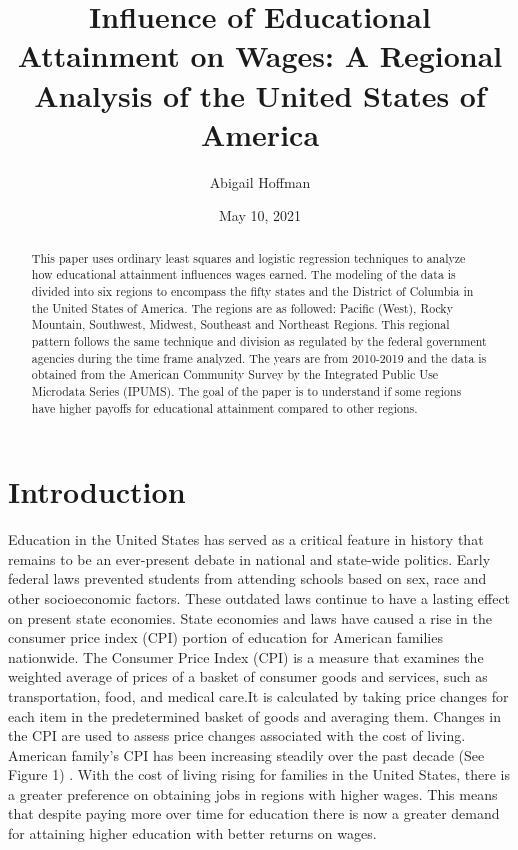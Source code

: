 \documentclass[12pt, English]{article}
\title{Influence of Educational Attainment on Wages: A Regional Analysis of the United States of America}
\author{Abigail Hoffman}
\date{May 10, 2021}
\begin{document}
\maketitle
\begin{abstract}
This paper uses ordinary least squares and logistic regression techniques to analyze how educational attainment influences wages earned. The modeling of the data is divided into six regions to encompass the fifty states and the District of Columbia in the United States of America. The regions are as followed: Pacific (West), Rocky Mountain, Southwest, Midwest, Southeast and Northeast Regions. This regional pattern follows the same technique and division as regulated by the federal government agencies during the time frame analyzed. The years are from 2010-2019 and the data is obtained from the American Community Survey by the Integrated Public Use Microdata Series (IPUMS). The goal of the paper is to understand if some regions have higher payoffs for educational attainment compared to other regions. 
\end{abstract}

\newpage

\section{Introduction}
\doublespacing
Education in the United States has served as a critical feature in history that remains to be an ever-present debate in national and state-wide politics. Early federal laws prevented students from attending schools based on sex, race and other socioeconomic factors. These outdated laws continue to have a lasting effect on present state economies. State economies and laws have caused a rise in the consumer price index (CPI) portion of education for American families nationwide. The Consumer Price Index (CPI) is a measure that examines the weighted average of prices of a basket of consumer goods and services, such as transportation, food, and medical care.It is calculated by taking price changes for each item in the predetermined basket of goods and averaging them. Changes in the CPI are used to assess price changes associated with the cost of living. American family's CPI has been increasing steadily over the past decade (See Figure 1) \citep{USBureauofLaborStatistics}. With the cost of living rising for families in the United States, there is a greater preference on obtaining jobs in regions with higher wages. This means that despite paying more over time for education there is now a greater demand for attaining higher education with better returns on wages. 
\end{document}
